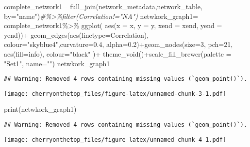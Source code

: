 \documentclass[
]{article}
\newenvironment{Shaded}{\begin{snugshade}}{\end{snugshade}}
\newcommand{\AttributeTok}[1]{\textcolor[rgb]{0.77,0.63,0.00}{#1}}
\newcommand{\CommentTok}[1]{\textcolor[rgb]{0.56,0.35,0.01}{\textit{#1}}}
\newcommand{\DecValTok}[1]{\textcolor[rgb]{0.00,0.00,0.81}{#1}}
\newcommand{\FloatTok}[1]{\textcolor[rgb]{0.00,0.00,0.81}{#1}}
\newcommand{\FunctionTok}[1]{\textcolor[rgb]{0.00,0.00,0.00}{#1}}
\newcommand{\NormalTok}[1]{#1}
\newcommand{\OtherTok}[1]{\textcolor[rgb]{0.56,0.35,0.01}{#1}}
\newcommand{\SpecialCharTok}[1]{\textcolor[rgb]{0.00,0.00,0.00}{#1}}
\newcommand{\StringTok}[1]{\textcolor[rgb]{0.31,0.60,0.02}{#1}}
\begin{document}
\begin{Shaded}
\begin{Highlighting}[]
\NormalTok{complete\_network1}\OtherTok{=} \FunctionTok{full\_join}\NormalTok{(network\_metadata,network\_table, }\AttributeTok{by=}\StringTok{"name"}\NormalTok{)}\CommentTok{\#\%\textgreater{}\%filter(Correlation!="NA")}
\NormalTok{netwkork\_graph1}\OtherTok{=}\NormalTok{ complete\_network1}\SpecialCharTok{\%\textgreater{}\%} \FunctionTok{ggplot}\NormalTok{( }\FunctionTok{aes}\NormalTok{(}\AttributeTok{x =}\NormalTok{ x, }\AttributeTok{y =}\NormalTok{ y, }\AttributeTok{xend =}\NormalTok{ xend, }\AttributeTok{yend =}\NormalTok{ yend))}\SpecialCharTok{+} \FunctionTok{geom\_edges}\NormalTok{(}\FunctionTok{aes}\NormalTok{(}\AttributeTok{linetype=}\NormalTok{Correlation), }\AttributeTok{colour=}\StringTok{"skyblue4"}\NormalTok{,}\AttributeTok{curvature=}\FloatTok{0.4}\NormalTok{,  }\AttributeTok{alpha=}\FloatTok{0.2}\NormalTok{)}\SpecialCharTok{+}\FunctionTok{geom\_nodes}\NormalTok{(}\AttributeTok{size=}\DecValTok{3}\NormalTok{, }\AttributeTok{pch=}\DecValTok{21}\NormalTok{,}
 \FunctionTok{aes}\NormalTok{(}\AttributeTok{fill=}\NormalTok{info),}
\AttributeTok{colour=}\StringTok{"black"}
\NormalTok{)}\SpecialCharTok{+}
\FunctionTok{theme\_void}\NormalTok{()}\SpecialCharTok{+}\FunctionTok{scale\_fill\_brewer}\NormalTok{(}\AttributeTok{palette =} \StringTok{"Set1"}\NormalTok{, }\AttributeTok{name=}\StringTok{""}\NormalTok{)}
\NormalTok{netwkork\_graph1}
\end{Highlighting}
\end{Shaded}

\begin{verbatim}
## Warning: Removed 4 rows containing missing values (`geom_point()`).
\end{verbatim}

\texttt{[image: cherryonthetop\_files/figure-latex/unnamed-chunk-3-1.pdf]}

\begin{Shaded}
\begin{Highlighting}[]
\FunctionTok{print}\NormalTok{(netwkork\_graph1)}
\end{Highlighting}
\end{Shaded}

\begin{verbatim}
## Warning: Removed 4 rows containing missing values (`geom_point()`).
\end{verbatim}

\texttt{[image: cherryonthetop\_files/figure-latex/unnamed-chunk-4-1.pdf]}
\end{document}
